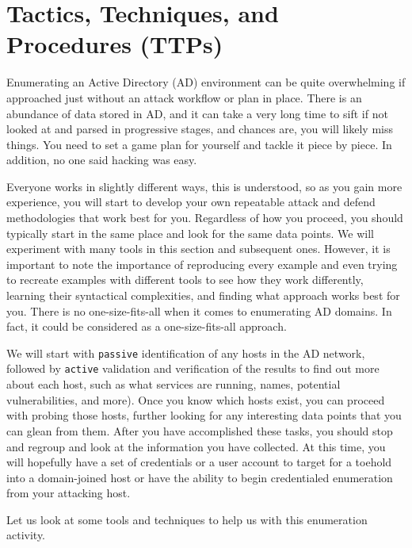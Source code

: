 \section{Tactics, Techniques, and Procedures (TTPs)}
Enumerating an Active Directory (AD) environment can be quite overwhelming if approached just without an attack workflow or plan in place. There is an abundance of data stored in AD, and it can take a very long time to sift if not looked at and parsed in progressive stages, and chances are, you will likely miss things. You need to set a game plan for yourself and tackle it piece by piece. In addition, no one said hacking was easy.

Everyone works in slightly different ways, this is understood, so as you gain more experience, you will start to develop your own repeatable attack and defend methodologies that work best for you. Regardless of how you proceed, you should typically start in the same place and look for the same data points. We will experiment with many tools in this section and subsequent ones. However, it is important to note the importance of reproducing every example and even trying to recreate examples with different tools to see how they work differently, learning their syntactical complexities, and finding what approach works best for you. There is no one-size-fits-all when it comes to enumerating AD domains. In fact, it could be considered as a one-size-fits-all approach.

We will start with \texttt{passive} identification of any hosts in the AD network, followed by \texttt{active} validation and verification of the results to find out more about each host, such as what services are running, names, potential vulnerabilities, and more). Once you know which hosts exist, you can proceed with probing those hosts, further looking for any interesting data points that you can glean from them. After you have accomplished these tasks, you should stop and regroup and look at the information you have collected. At this time, you will hopefully have a set of credentials or a user account to target for a toehold into a domain-joined host or have the ability to begin credentialed enumeration from your attacking host.

Let us look at some tools and techniques to help us with this enumeration activity.

